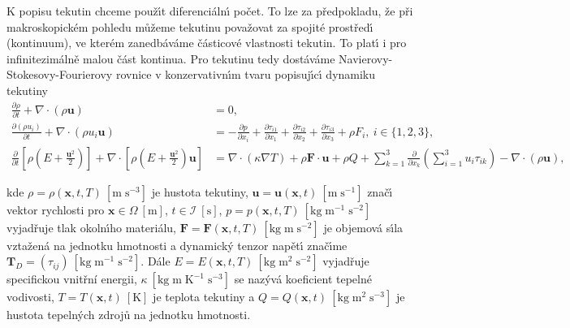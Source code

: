         K popisu tekutin chceme pou\v{z}\'{\i}t diferenci\'{a}ln\'{\i} po\v{c}et. To lze za p\v{r}edpokladu, \v{z}e p\v{r}i makroskopick\'{e}m pohledu m\r{u}\v{z}eme tekutinu pova\v{z}ovat za spojit\'{e} prost\v{r}ed\'{\i} (kontinuum), ve kter\'{e}m zanedb\'{a}v\'{a}me \v{c}\'{a}sticov\'{e} vlastnosti tekutin. To plat\'{\i} i pro infinitezim\'{a}ln\v{e} malou \v{c}\'{a}st kontinua. Pro tekutinu tedy dost\'{a}v\'{a}me Navierovy-Stokesovy-Fourierovy rovnice v konzervativn\'{\i}m tvaru popisuj\'{\i}c\'{\i} dynamiku tekutiny
        \begin{subequations}
        \label{eq:NSequ}
        \begin{align}
            \frac{\partial \rho}{\partial t} + \nabla \cdot (\rho \boldsymbol{u}) &= 0, 	\label{eq:ConEqu} \\    
            \frac{\partial (\rho u_i)}{\partial t} + \nabla \cdot (\rho u_i \boldsymbol{u}) &= - \frac{\partial p}{\partial x_i} + \frac{\partial \tau_{i1}}{\partial x_1} + \frac{\partial \tau_{i2}}{\partial x_2} + \frac{\partial \tau_{i3}}{\partial x_3} + \rho F_i, \ i \in \{1,2,3\}, \label{eq:LawConMom} \\
            \frac{\partial}{\partial t}\left[\rho\left(E + \frac{\boldsymbol{u}^2}{2}\right)\right] + \nabla \cdot \left[\rho\left( E + \frac{\boldsymbol{u}^2}{2}\right)\boldsymbol{u}\right] &= \nabla \cdot (\kappa \nabla T) + \rho \boldsymbol{F} \cdot \boldsymbol{u} + \rho Q + \sum_{k=1}^{3}\frac{\partial}{\partial x_k}\left(\sum_{i=1}^{3}u_i\tau_{ik}\right) - \nabla \cdot (\rho \boldsymbol{u}), \label{eq:LawConPotEne}
        \end{align}    
        \end{subequations}
        
        kde $\rho = \rho(\boldsymbol{x},t, T) \ [\mathrm{m \; s^{-3}}]$  je hustota tekutiny, $\boldsymbol{u} = \boldsymbol{u}(\boldsymbol{x},t) \ [\mathrm{m \; s^{-1}}]$ zna\v{c}\'{\i} vektor rychlosti pro $\boldsymbol{x} \in \Omega \ [\mathrm{m}]$, $t \in \mathcal{I} \ [ \mathrm{s}]$, $p = p(\boldsymbol{x},t, T) \ [\mathrm{kg \; m^{-1} \; s^{-2}}]$ vyjad\v{r}uje tlak okoln\'\i ho materi\'alu, $\boldsymbol{F} = \boldsymbol{F}(\boldsymbol{x},t, T) \ [\mathrm{kg \; m \; s^{-2}}]$ je objemov\'a s\'\i la vzta\v{z}en\'a na jednotku hmotnosti a dynamick\'y tenzor nap\v{e}t\'{\i} zna\v{c}\'{\i}me $\boldsymbol{T}_D = (\tau_{ij}) \ [ \mathrm{kg \; m^{-1} \; s^{-2}}]$. D\'ale $E = E(\boldsymbol{x},t, T) \ [\mathrm{kg \; m^{2} \; s^{-2}}]$ vyjad\v{r}uje specifickou vnit\v{r}n\'i energii, $\kappa  \ [\mathrm{kg \; m \; K^{-1} \; s^{-3}}]$ se naz\'yv\'a koeficient tepeln\'e vodivosti, $T = T(\boldsymbol{x},t) \ [\mathrm{K}]$ je teplota tekutiny  a $Q = Q (\boldsymbol{x},t) \ [\mathrm{kg \; m^{2} \; s^{-3}}]$ je hustota tepeln\'{y}ch zdroj\r{u} na jednotku hmotnosti.
        
